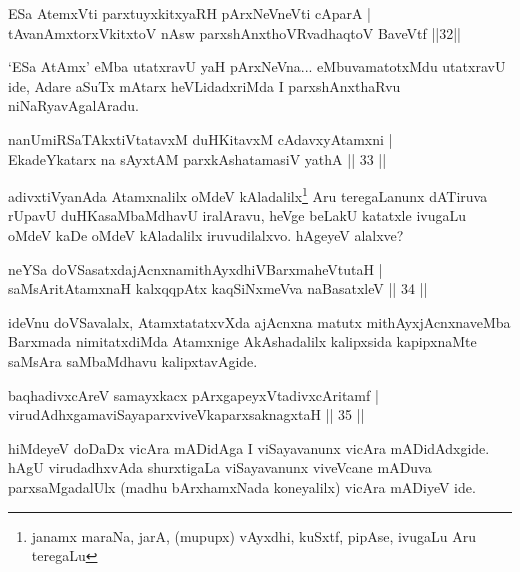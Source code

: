 
\begin{shl}
ESa AtemxVti parxtuyxkitxyaRH pArxNeVneVti cAparA |\\
tAvanAmxtorxVkitxtoV nAsw parxshAnxthoVR\s vadhaqtoV BaveVtf \hfill ||32||
\end{shl}

\begin{artha}
`ESa AtAmx' eMba utatxravU yaH pArxNeVna... eMbuva\break matotxMdu utatxravU ide, Adare aSuTx mAtarx heVLidadxriMda I parxshAnxthaRvu niNaRyavAgalAradu.
\end{artha}


\begin{shl}
nanUmiRSaTAkxtiVtatavxM duHKitavxM cAdavxyAtamxni |\\
EkadeYkatarx na sAyxtAM parxkAshatamasiV yathA \hfill || 33 ||
\end{shl}

\begin{artha}
adivxtiVyanAda Atamxnalilx oMdeV kAladalilx\footnote{janamx maraNa, jarA, (mupupx) vAyxdhi, kuSxtf, pipAse, ivugaLu Aru teregaLu}  Aru teregaLanunx dATiruva rUpavU duHKasaMbaMdhavU iralAravu, heVge beLakU katatxle ivugaLu oMdeV kaDe oMdeV kAladalilx iruvudilalxvo. hAgeyeV alalxve? 
\end{artha}


\begin{shl}
neYSa doVSasatxdajAcnxnamithAyxdhiVBarxmaheVtutaH |\\
saMsAritA\s \s tamxnaH kalxqqpAtx kaqSiNxmeVva naBasatxleV \hfill || 34 ||
\end{shl}

\begin{artha}%
ideVnu doVSavalalx, AtamxtatatxvXda ajAcnxna matutx mithAyxjAcnxnaveMba Barxmada nimitatxdiMda Atamxnige AkAshadalilx kalipxsida kapipxnaMte saMsAra saMbaMdhavu kalipxtavAgide.
\end{artha}

\begin{shl}
baqhadivxcAreV samayxkacx pArxgapeyxVtadivxcAritamf |\\
virudAdhxgamaviSayaparxviveVkaparxsaknagxtaH \hfill || 35 ||
\end{shl}

\begin{artha}
hiMdeyeV doDaDx vicAra mADidAga I viSayavanunx vicAra mADidAdxgide. hAgU virudadhxvAda shurxtigaLa viSayavanunx viveVcane mADuva parxsaMgadalUlx (madhu bArxhamxNada koneyalilx) vicAra mADiyeV ide.
\end{artha}

